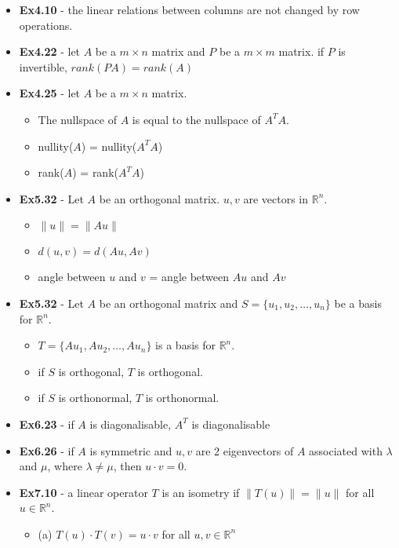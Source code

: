 \documentclass[10pt, portrait]{article}
\begin{document}
\begin{itemize}
\begin{itemize}
    \end{itemize}
    \item \textbf{Ex4.10} - the linear relations between columns are not changed by row operations.
    \item \textbf{Ex4.22} - let $A$ be a $m \times n$ matrix and $P$ be a $m \times m$ matrix. if $P$ is invertible, $rank(PA) = rank(A)$
    \item \textbf{Ex4.25} - let $A$ be a $m \times n$ matrix. 
    \begin{itemize}
        \item The nullspace of $A$ is equal to the nullspace of $A^TA$.
        \item nullity($A$) = nullity($A^TA$)
        \item rank($A$) = rank($A^TA$)
    \end{itemize}
    \item \textbf{Ex5.32} - Let $A$ be an orthogonal matrix. $u, v$ are vectors in $\mathbb{R}^n$.
    \begin{itemize}
        \item $\| u \| = \| Au \|$
        \item $d(u, v) = d(Au, Av)$
        \item angle between $u$ and $v$ = angle between $Au$ and $Av$ 
    \end{itemize}
    \item \textbf{Ex5.32} - Let $A$ be an orthogonal matrix and $S = \{u_1, u_2, \dots, u_n\}$ be a basis for $\mathbb{R}^n$.
    \begin{itemize}
        \item $T = \{Au_1, Au_2, \dots, Au_n\}$ is a basis for $\mathbb{R}^n$.
        \item if $S$ is orthogonal, $T$ is orthogonal. 
        \item if $S$ is orthonormal, $T$ is orthonormal. 
    \end{itemize}
    \item \textbf{Ex6.23} - if $A$ is diagonalisable, $A^T$ is diagonalisable
    \item \textbf{Ex6.26} - if $A$ is symmetric and $u, v$ are 2 eigenvectors of $A$ associated with $\lambda$ and $\mu$, where $\lambda \neq \mu$, then $u \cdot v = 0$.
    \item \textbf{Ex7.10} - a linear operator $T$ is an isometry if $\|T(u)\| = \|u\|$ for all $u \in \mathbb{R}^n$.
    \begin{itemize}
        \item (a) $T(u) \cdot T(v) = u \cdot v$ for all $u, v \in \mathbb{R}^n$

\end{itemize}
\end{itemize}
\end{document}
